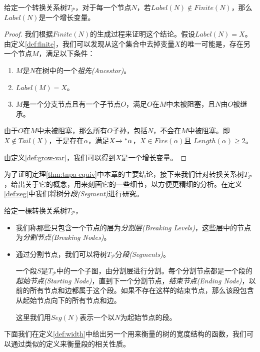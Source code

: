 \begin{lem}\label{lemma:finite}
给定一个转换关系树$T_{\mathcal{P}}$，对于每一个节点$N$，若$Label(N)\notin Finite(N)$，那么$Label(N)$是一个增长变量。
\end{lem}

\begin{proof}
我们根据$Finite(N)$的生成过程来证明这个结论。假设$Label(N)=X$。由定义\ref{def:finite}，我们可以发现从这个集合中去掉变量$X$的唯一可能是，存在另一个节点$M$，满足以下条件：
\begin{enumerate}
\item $M$是$N$在树中的一个\emph{祖先(Ancestor)}。
\item $Label(M)=X$。
\item $M$是一个分支节点且有一个子节点$O$，满足$O$在$M$中未被阻塞，且$N$由$O$被继承。
\end{enumerate}

由于$O$在$M$中未被阻塞，那么所有$O$子孙，包括$N$，不会在$M$中被阻塞。即$X\notin Tail(X)$，于是存在$\alpha$，满足$X{\xrightarrow{}{}}^{*}\alpha$，$X\in Fire(\alpha)$且 $Length(\alpha)\geq 2$。

由定义\ref{def:grow-var}，我们可以得到$X$是一个增长变量。
\end{proof}

为了证明定理\ref{thm:tnpa-equiv}中本章的主要结论，接下来我们针对转换关系树$T_{\mathcal{P}}$，给出关于它的概念，用来刻画它的一些细节，以方便更精细的分析。在定义\ref{def:seg}中我们将树分\emph{段(Segment)}进行研究。

\begin{defn}\label{def:seg}
给定一棵转换关系树$T_{\mathcal{P}}$，
\begin{itemize}
	\item 我们称那些只包含一个节点的层为\emph{分割层(Breaking Levels)}，这些层中的节点为\emph{分割节点(Breaking Nodes)}。
	\item 通过分割节点，我们可以将树$T_{\mathcal{P}}$分\emph{段(Segments)}。

一个段$S$是$T_{\mathcal{P}}$中的一个子图，由分割层进行分割。每个分割节点都是一个段的\emph{起始节点(Starting Node)}，直到下一个分割节点，\emph{结束节点(Ending Node)}，以前的所有节点和边都属于这个段。如果不存在这样的结束节点，那么该段包含从起始节点向下的所有节点和边。

这里我们用$Seg(N)$表示一个以$N$为起始节点的段。
\end{itemize}
\end{defn}

下面我们在定义\ref{def:width}中给出另一个用来衡量的树的宽度结构的函数，我们可以通过类似的定义来衡量段的相关性质。

